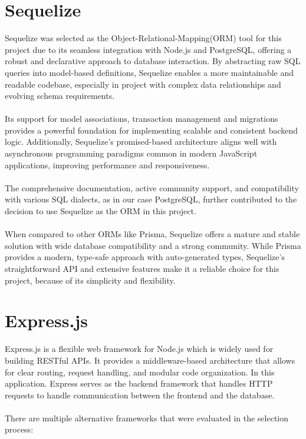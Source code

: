 \documentclass[a4paper,12pt]{report}
\begin{document}
\section{Sequelize}
Sequelize was selected as the Object-Relational-Mapping(ORM) tool for this project due to its seamless integration with Node.js and PostgreSQL, offering a robust and declarative approach to database interaction. By abstracting raw SQL queries into model-based definitions, Sequelize enables a more maintainable and readable codebase, especially in project with complex data relationships and evolving schema requirements.\\\\
Its support for model associations, transaction management and migrations provides a powerful foundation for implementing scalable and consistent backend logic. Additionally, Sequelize's promised-based architecture aligns well with asynchronous programming paradigms common in modern JavaScript applications, improving performance and responsiveness.\parencite{sequelizegit}\\\\
The comprehensive documentation, active community support, and compatibility with various SQL dialects, as in our case PostgreSQL, further contributed to the decision to use Sequelize as the ORM in this project.\\\\
When compared to other ORMs like Prisma, Sequelize offers a mature and stable solution with wide database compatibility and a strong community. While Prisma provides a modern, type-safe approach with auto-generated types, Sequelize's straightforward API and extensive features make it a reliable choice for this project, because of its simplicity and flexibility.\parencite{Ormcomparemedium}\parencite{Ormcomparedhiwise}
\section{Express.js}
Express.js is a flexible web framework for Node.js which is widely used for building RESTful APIs. It provides a middleware-based architecture that allows for clear routing, request handling, and modular code organization. In this application. Express serves as the backend framework that handles HTTP requests to handle communication between the frontend and the database. \cite{expr-base} \\ \\
There are multiple alternative frameworks that were evaluated in the selection process:
\end{document}
